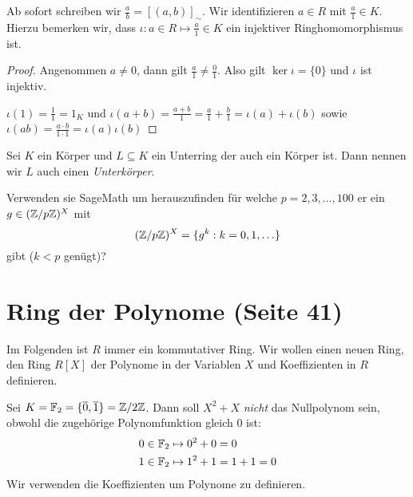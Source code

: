 	Ab sofort schreiben wir $\frac{a}{b} = [(a,b)]_{\sim}$.
	Wir identifizieren $a \in R$ mit $\frac{a}{1} \in K$. Hierzu bemerken wir, dass $\iota: a \in R \mapsto \frac{a}{1} \in K $ ein injektiver Ringhomomorphismus ist.

\begin{proof}
	Angenommen $a\neq 0$, dann gilt $\frac{a}{1} \neq  \frac{0}{1}$.
	Also gilt $\ker \iota = \{0\} $ und $\iota $ ist injektiv.

	$\iota(1) = \frac{1}{1} = 1_{K}$ und $\iota(a+b) = \frac{a+b}{1} = \frac{a}{1} + \frac{b}{1} = \iota(a) + \iota(b)$ sowie
	$\iota(ab) = \frac{a\cdot b}{1\cdot 1} = \iota(a) \iota(b)$
\end{proof}

\begin{definition}
	Sei $K$ ein Körper und $L \subseteq K$ ein Unterring der auch ein Körper ist. Dann nennen wir $L$ auch einen \emph{Unterkörper}.
\end{definition}

\begin{eg}
	Verwenden sie SageMath um herauszufinden für welche $p=2,3,\ldots,100$ er ein $g \in (\mathbb{Z} / p \mathbb{Z})^{X}$ mit
	\[
		(\mathbb{Z} / p \mathbb{Z})^{X} = \{g^{k} : k = 0,1,\ldots\} 
	\]
	gibt ($k < p$ genügt)?
\end{eg}

\section{Ring der Polynome (Seite 41)}
Im Folgenden ist $R$ immer ein kommutativer Ring. Wir wollen einen neuen Ring, den Ring $R[X]$ der Polynome
in der Variablen $X$ und Koeffizienten in $R$ definieren.

\begin{eg}
	Sei $K = \mathbb{F}_{2} = \{\overline{0},\overline{1}\} = \mathbb{Z} / 2\mathbb{Z}$. Dann soll $X^2+ X $ \emph{nicht} das Nullpolynom sein,
	obwohl die zugehörige Polynomfunktion gleich $0$ ist: 
	\begin{align*}
		&0 \in \mathbb{F}_{2} \mapsto 0^2 + 0 = 0\\ 
		&1 \in \mathbb{F}_{2} \mapsto 1^2 + 1 = 1+1 = 0
	\end{align*}
	Wir verwenden die Koeffizienten um Polynome zu definieren.
\end{eg}

